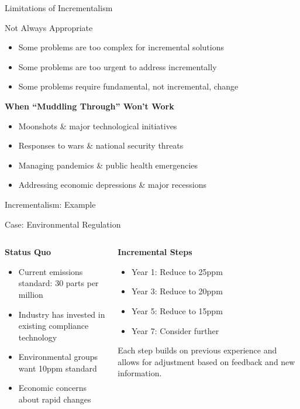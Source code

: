 \documentclass[10pt]{beamer}
\begin{document}
\begin{frame}{Limitations of Incrementalism}
\begin{block}{Not Always Appropriate}
\begin{itemize}
\item Some problems are too complex for incremental solutions
\item Some problems are too urgent to address incrementally
\item Some problems require fundamental, not incremental, change
\end{itemize}
\end{block}

\textbf{When ``Muddling Through'' Won't Work}
\begin{itemize}
\item Moonshots \& major technological initiatives
\item Responses to wars \& national security threats
\item Managing pandemics \& public health emergencies
\item Addressing economic depressions \& major recessions
\end{itemize}
\end{frame}

\begin{frame}{Incrementalism: Example}
\begin{block}{Case: Environmental Regulation}
\end{block}
\begin{columns}
\begin{column}{0.5\textwidth}
\textbf{Status Quo}
\begin{itemize}
\item Current emissions standard: 30 parts per million
\item Industry has invested in existing compliance technology
\item Environmental groups want 10ppm standard
\item Economic concerns about rapid changes
\end{itemize}
\end{column}
\begin{column}{0.5\textwidth}
\textbf{Incremental Steps}
\begin{itemize}
\item Year 1: Reduce to 25ppm
\item Year 3: Reduce to 20ppm
\item Year 5: Reduce to 15ppm
\item Year 7: Consider further
\end{itemize}
\vspace{0.3cm}
\footnotesize{Each step builds on previous experience and allows for adjustment based on feedback and new information.}
\end{column}
\end{columns}
\end{frame}
\end{document}
